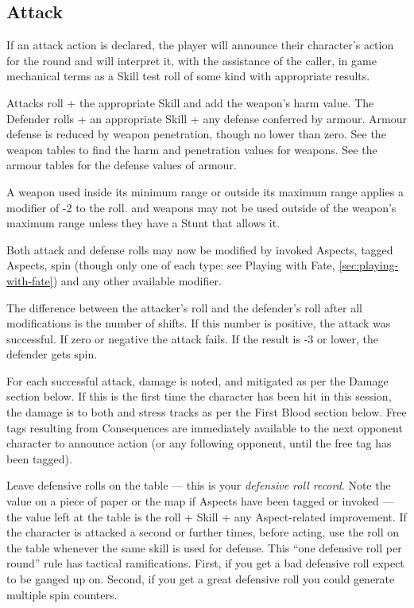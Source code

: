 \subsection{Attack}\label{sec:personal-combat-attack}

If an attack action is declared, the player will announce their character's action for the round and will interpret it, with the assistance of the caller, in game mechanical terms as a Skill test roll of some kind with appropriate results.

Attacks roll \dF{} + the appropriate Skill and add the weapon's harm value. The Defender rolls \dF{} + an appropriate Skill + any defense conferred by armour. Armour defense is reduced by weapon penetration, though no lower than zero. See the weapon tables to find the harm and penetration values for weapons. See the armour tables for the defense values of armour.

A weapon used inside its minimum range or outside its maximum range applies a modifier of -2 to the roll.  and  weapons may not be used outside of the weapon's maximum range unless they have a Stunt that allows it.

Both attack and defense rolls may now be modified by invoked Aspects, tagged Aspects, spin (though only one of each type: see Playing with Fate, \autoref{sec:playing-with-fate}) and any other available modifier.

The difference between the attacker's roll and the defender's roll after all modifications is the number of shifts. If this number is positive, the attack was successful. If zero or negative the attack fails. If the result is -3 or lower, the defender gets spin.

For each successful attack, damage is noted, and mitigated as per the Damage section below. If this is the first time the character has been hit in this session, the damage is to both \Health{} and \Composure{} stress tracks as per the First Blood section below. Free tags resulting from Consequences are immediately available to the next opponent character to announce action (or any following opponent, until the free tag has been tagged).

Leave defensive rolls on the table --- this is your \emph{defensive roll record}. Note the value on a piece of paper or the map if Aspects have been tagged or invoked --- the value left at the table is the roll + Skill + any Aspect-related improvement. If the character is attacked a second or further times, before acting, use the roll on the table whenever the same skill is used for defense. This ``one defensive roll per round'' rule has tactical ramifications. First, if you get a bad defensive roll expect to be ganged up on. Second, if you get a great defensive roll you could generate multiple spin counters.

